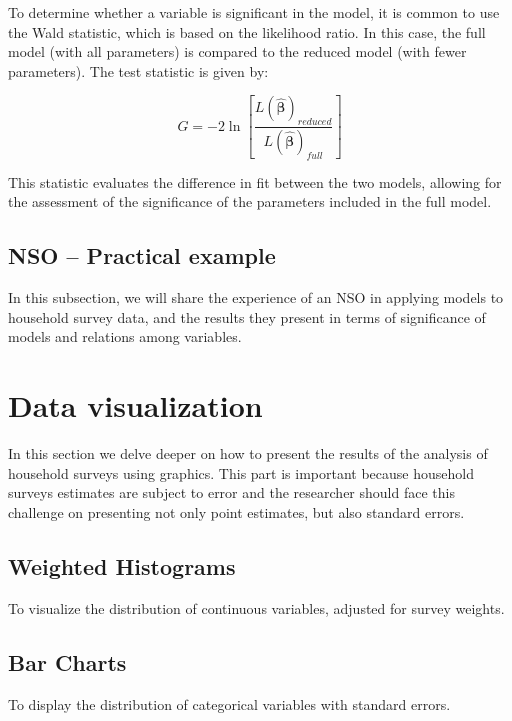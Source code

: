 \documentclass[
  12pt,
]{book}
\begin{document}
To determine whether a variable is significant in the model, it is common to use the Wald statistic, which is based on the likelihood ratio. In this case, the full model (with all parameters) is compared to the reduced model (with fewer parameters). The test statistic is given by:

\[
G=-2\ln\left[\frac{L\left(\hat{\boldsymbol{\beta}}\right)_{reduced}}{L\left(\hat{\boldsymbol{\beta}}\right)_{full}}\right]
\]

This statistic evaluates the difference in fit between the two models, allowing for the assessment of the significance of the parameters included in the full model.

\hypertarget{nso-practical-example-2}{%
\section{NSO -- Practical example}\label{nso-practical-example-2}}

In this subsection, we will share the experience of an NSO in applying models to household survey data, and the results they present in terms of significance of models and relations among variables.

\hypertarget{data-visualization}{%
\chapter{Data visualization}\label{data-visualization}}

In this section we delve deeper on how to present the results of the analysis of household surveys using graphics. This part is important because household surveys estimates are subject to error and the researcher should face this challenge on presenting not only point estimates, but also standard errors.

\hypertarget{weighted-histograms}{%
\section{Weighted Histograms}\label{weighted-histograms}}

To visualize the distribution of continuous variables, adjusted for survey weights.

\hypertarget{bar-charts}{%
\section{Bar Charts}\label{bar-charts}}

To display the distribution of categorical variables with standard errors.
\end{document}
